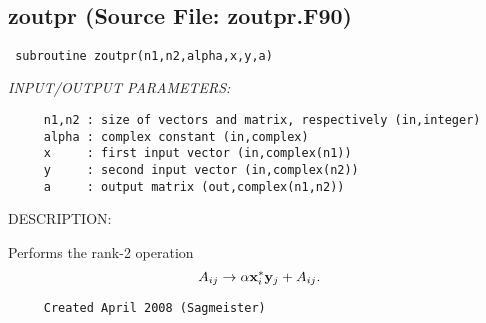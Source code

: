 \documentclass[11pt]{article}
\begin{document}
 
 
\mbox{}\hrulefill\ 
 
\subsection{zoutpr (Source File: zoutpr.F90)}


\begin{verbatim} subroutine zoutpr(n1,n2,alpha,x,y,a)\end{verbatim}{\em INPUT/OUTPUT PARAMETERS:}
\begin{verbatim}     n1,n2 : size of vectors and matrix, respectively (in,integer)
     alpha : complex constant (in,complex)
     x     : first input vector (in,complex(n1))
     y     : second input vector (in,complex(n2))
     a     : output matrix (out,complex(n1,n2))\end{verbatim}
{\sf DESCRIPTION:\\ }


     Performs the rank-2 operation
     $$ A_{ij}\rightarrow\alpha{\bf x}_i^*{\bf y}_j+A_{ij}. $$
  
\begin{verbatim}     Created April 2008 (Sagmeister)\end{verbatim}

\end{document}
